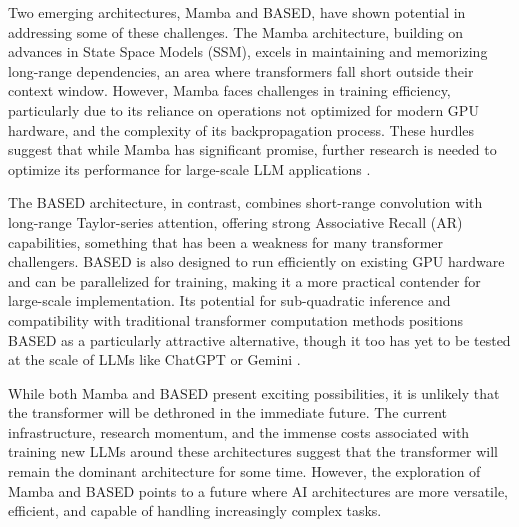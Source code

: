 Two emerging architectures, Mamba and BASED, have shown potential in addressing some of these challenges. The Mamba architecture, building on advances in State Space Models (SSM), excels in maintaining and memorizing long-range dependencies, an area where transformers fall short outside their context window. However, Mamba faces challenges in training efficiency, particularly due to its reliance on operations not optimized for modern GPU hardware, and the complexity of its backpropagation process. These hurdles suggest that while Mamba has significant promise, further research is needed to optimize its performance for large-scale LLM applications \cite{gu2023mamba}.

The BASED architecture, in contrast, combines short-range convolution with long-range Taylor-series attention, offering strong Associative Recall (AR) capabilities, something that has been a weakness for many transformer challengers. BASED is also designed to run efficiently on existing GPU hardware and can be parallelized for training, making it a more practical contender for large-scale implementation. Its potential for sub-quadratic inference and compatibility with traditional transformer computation methods positions BASED as a particularly attractive alternative, though it too has yet to be tested at the scale of LLMs like ChatGPT or Gemini \cite{arora2023based}.

While both Mamba and BASED present exciting possibilities, it is unlikely that the transformer will be dethroned in the immediate future. The current infrastructure, research momentum, and the immense costs associated with training new LLMs around these architectures suggest that the transformer will remain the dominant architecture for some time. However, the exploration of Mamba and BASED points to a future where AI architectures are more versatile, efficient, and capable of handling increasingly complex tasks.

